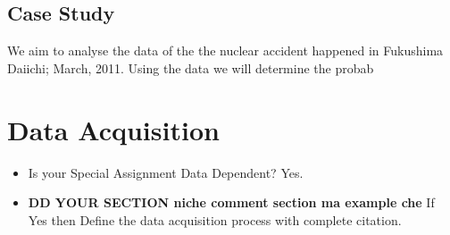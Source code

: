 \documentclass{article}
\begin{document}
\subsection{Case Study}
We aim to analyse the data of the the nuclear accident happened in Fukushima Daiichi; March, 2011. Using the data we will determine the probab



\section{Data Acquisition }

\begin{itemize}
    \item Is your Special Assignment Data Dependent? Yes.

    \item \textbf{DD YOUR SECTION niche comment section ma example che}
    If Yes then Define the data acquisition process with complete citation.
\end{itemize}
\end{document}
